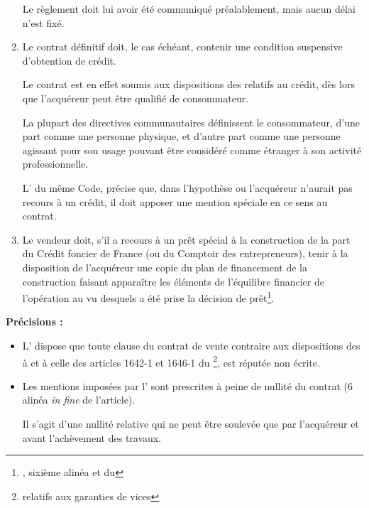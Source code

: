 \begin{enumerate}
					Le règlement doit lui avoir été communiqué préalablement, mais aucun délai n'est fixé.


					\item 	Le contrat définitif doit, le cas échéant, contenir une condition suspensive d’obtention de crédit.

					Le contrat est en effet soumis aux dispositions des  relatifs au crédit, dès lors que l’acquéreur peut être qualifié de consommateur.

					La plupart des directives communautaires définissent le consommateur, d’une part comme une personne physique, et d’autre part comme une personne agissant pour son usage pouvant être considéré comme étranger à son activité professionnelle.


					L’ du même Code, précise que, dans l’hypothèse ou l’acquéreur n’aurait pas recours à un crédit, il doit apposer une mention spéciale en ce sens au contrat.


					\item 	Le vendeur doit, s’il a recours à un prêt spécial à la construction de la part du Crédit foncier de France (ou du Comptoir des entrepreneurs), tenir à la disposition de l'acquéreur une copie du plan de financement de la construction faisant apparaître les éléments de l'équilibre financier de l'opération au vu desquels a été prise la décision de prêt\footnote{, sixième alinéa et  du \cch*}.
				\end{enumerate}

				\bigbreak\noindent\textbf{Précisions :}

				\begin{itemize}
					\item L' dispose que toute clause du contrat de vente contraire aux dispositions des  à  et à celle des articles 1642-1 et 1646-1 du \cciv\footnote{relatifs aux garanties de vices}, est réputée non écrite.

					\item Les mentions imposées par l’ sont prescrites à peine de nullité du contrat (6\ieme{} alinéa \emph{in fine} de l’article).

					Il s’agit d’une nullité relative qui ne peut être soulevée que par l’acquéreur et avant l’achèvement des travaux.
				\end{itemize}



